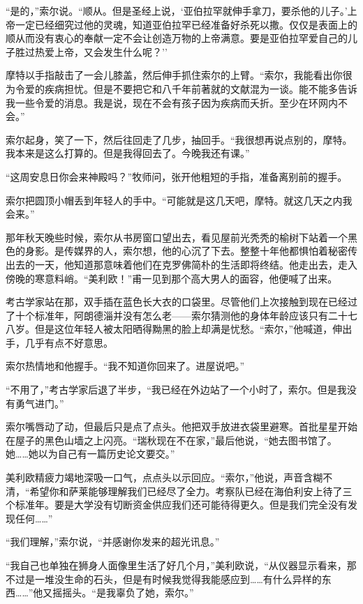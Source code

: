 \documentclass[AutoFakeBold=true]{book}
\begin{document}
``是的，''索尔说。``顺从。但是圣经上说，`亚伯拉罕就伸手拿刀，要杀他的儿子。'上帝一定已经细究过他的灵魂，知道亚伯拉罕已经准备好杀死以撒。仅仅是表面上的顺从而没有衷心的奉献一定不会让创造万物的上帝满意。要是亚伯拉罕爱自己的儿子胜过热爱上帝，又会发生什么呢？''

摩特以手指敲击了一会儿膝盖，然后伸手抓住索尔的上臂。``索尔，我能看出你很为令爱的疾病担忧。但是不要把它和八千年前著就的文献混为一谈。能不能多告诉我一些令爱的消息。我是说，现在不会有孩子因为疾病而夭折。至少在环网内不会。''

索尔起身，笑了一下，然后往回走了几步，抽回手。``我很想再说点别的，摩特。我本来是这么打算的。但是我得回去了。今晚我还有课。''

``这周安息日你会来神殿吗？''牧师问，张开他粗短的手指，准备离别前的握手。

索尔把圆顶小帽丢到年轻人的手中。``可能就是这几天吧，摩特。就这几天之内我会来。''

\vspace*{1em}

那年秋天晚些时候，索尔从书房窗口望出去，看见屋前光秃秃的榆树下站着一个黑色的身影。是传媒界的人，索尔想，他的心沉了下去。整整十年他都惧怕着秘密传出去的一天，他知道那意味着他们在克罗佛简朴的生活即将终结。他走出去，走入傍晚的寒意料峭。``美利欧！''甫一见到那个高大男人的面容，他便喊了出来。

考古学家站在那，双手插在蓝色长大衣的口袋里。尽管他们上次接触到现在已经过了十个标准年，阿朗德淄并没有怎么老——索尔猜测他的身体年龄应该只有二十七八岁。但是这位年轻人被太阳晒得黝黑的脸上却满是忧愁。``索尔，''他喊道，伸出手，几乎有点不好意思。

索尔热情地和他握手。``我不知道你回来了。进屋说吧。''

``不用了，''考古学家后退了半步，``我已经在外边站了一个小时了，索尔。但是我没有勇气进门。''

索尔嘴唇动了动，但最后只是点了点头。他把双手放进衣袋里避寒。首批星星开始在屋子的黑色山墙之上闪亮。``瑞秋现在不在家，''最后他说，``她去图书馆了。她……她以为自己有一篇历史论文要交。''

美利欧精疲力竭地深吸一口气，点点头以示回应。``索尔，''他说，声音含糊不清，``希望你和萨莱能够理解我们已经尽了全力。考察队已经在海伯利安上待了三个标准年。要是大学没有切断资金供应我们还可能待得更久。但是我们完全没有发现任何……''

``我们理解，''索尔说，``并感谢你发来的超光讯息。''

``我自己也单独在狮身人面像里生活了好几个月，''美利欧说，``从仪器显示看来，那不过是一堆没生命的石头，但是有时候我觉得我能感应到……有什么异样的东西……''他又摇摇头。``是我辜负了她，索尔。''
\end{document}
